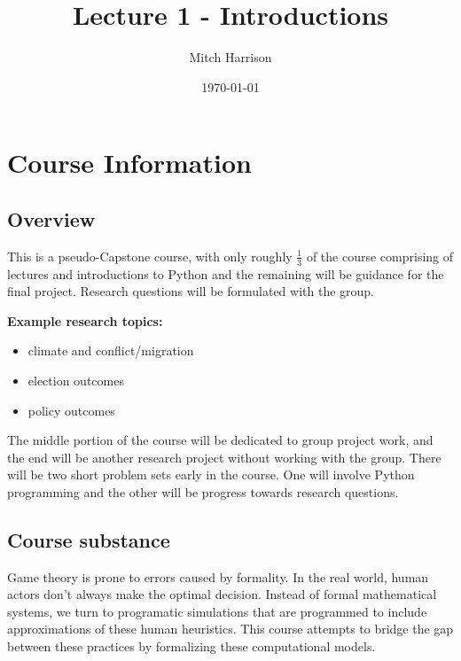 \documentclass[titlepage, 12pt, leqno]{article}
\title{\Huge{Lecture 1 - Introductions}}
\author{\large{Mitch Harrison}}
\date{\today}
\begin{document}
\setlength{\parskip}{1\baselineskip}
\setlength{\parindent}{15pt}
\maketitle
\tableofcontents
\newpage


\section{Course Information}
\subsection{Overview}
This is a pseudo-Capstone course, with only roughly $\frac{1}{3}$ of the course
comprising of lectures and introductions to Python and the remaining will be
guidance for the final project. Research questions will be formulated with the
group.

\begin{note}
    \textbf{Example research topics:}
    \begin{itemize}
        \item climate and conflict/migration
        \item election outcomes
        \item policy outcomes
    \end{itemize}
\end{note}


The middle portion of the course will be dedicated to group project work, and
the end will be another research project without working with the group. There
will be two short problem sets early in the course. One will involve Python
programming and the other will be progress towards research questions.

\subsection{Course substance}
Game theory is prone to errors caused by formality. In the real world, human
actors don't always make the optimal decision. Instead of formal mathematical
systems, we turn to programatic simulations that are programmed to include 
approximations of these human heuristics. This course attempts to bridge the gap
between these practices by formalizing these computational models.
\end{document}
